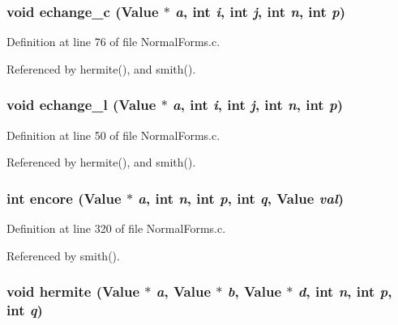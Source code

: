 \subsubsection{\setlength{\rightskip}{0pt plus 5cm}void echange\_\-c (Value $\ast$ {\em a}, int {\em i}, int {\em j}, int {\em n}, int {\em p})\hspace{0.3cm}{\tt  [static]}}\label{NormalForms_8c_a3}




Definition at line 76 of file Normal\-Forms.c.

Referenced by hermite(), and smith().

\subsubsection{\setlength{\rightskip}{0pt plus 5cm}void echange\_\-l (Value $\ast$ {\em a}, int {\em i}, int {\em j}, int {\em n}, int {\em p})\hspace{0.3cm}{\tt  [static]}}\label{NormalForms_8c_a2}




Definition at line 50 of file Normal\-Forms.c.

Referenced by hermite(), and smith().

\subsubsection{\setlength{\rightskip}{0pt plus 5cm}int encore (Value $\ast$ {\em a}, int {\em n}, int {\em p}, int {\em q}, Value {\em val})\hspace{0.3cm}{\tt  [static]}}\label{NormalForms_8c_a10}




Definition at line 320 of file Normal\-Forms.c.

Referenced by smith().

\subsubsection{\setlength{\rightskip}{0pt plus 5cm}void hermite (Value $\ast$ {\em a}, Value $\ast$ {\em b}, Value $\ast$ {\em d}, int {\em n}, int {\em p}, int {\em q})\hspace{0.3cm}{\tt  [static]}}\label{NormalForms_8c_a12}




